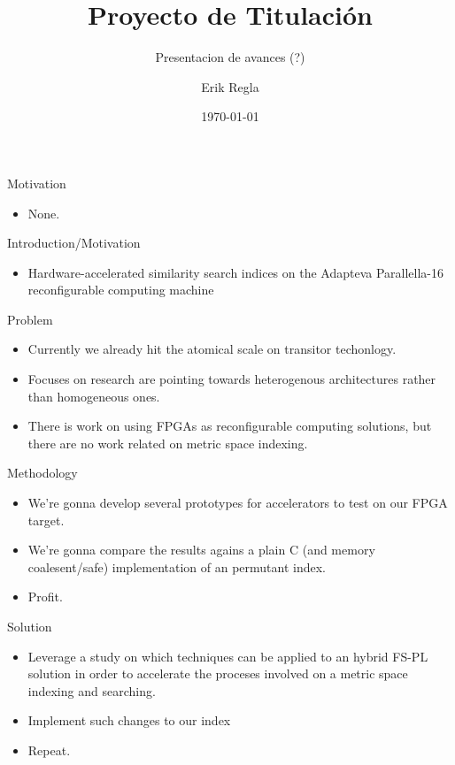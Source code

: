 \documentclass{beamer}
\title[Proyecto de Titulación]{Proyecto de Titulación}
\subtitle{Presentacion de avances (?)}
\author[E. Regla]{Erik Regla}
\institute[UTalca]{Universidad de Talca}
\date{\today}
\begin{document}
\begin{frame}
  \titlepage
\end{frame}



\begin{frame}
	Motivation
	\begin{itemize}
		\item None.
	\end{itemize}
  \end{frame}


\begin{frame}
	Introduction/Motivation
	\begin{itemize}
		\item Hardware-accelerated similarity search indices on the Adapteva Parallella-16 reconfigurable computing machine
	\end{itemize}
  \end{frame}


  \begin{frame}
	Problem
	\begin{itemize}
		\item Currently we already hit the atomical scale on transitor techonlogy.
		\item Focuses on research are pointing towards heterogenous architectures rather than homogeneous ones.
		\item There is work on using FPGAs as reconfigurable computing solutions, but there are no work related on metric space indexing.
	\end{itemize}
  \end{frame}



\begin{frame}
	Methodology
	\begin{itemize}
		\item We're gonna develop several prototypes for accelerators to test on our FPGA target.
		\item We're gonna compare the results agains a plain C (and memory coalesent/safe) implementation of an permutant index.
		\item Profit.
	\end{itemize}
  \end{frame}


\begin{frame}
	Solution
	\begin{itemize}
		\item Leverage a study on which techniques can be applied to an hybrid FS-PL solution in order to accelerate the proceses involved on a metric space indexing and searching.
		\item Implement such changes to our index
		\item Repeat.
	\end{itemize}
  \end{frame}
\end{document}
